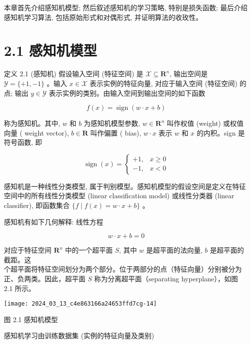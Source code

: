 \documentclass[10pt]{article}
\begin{document}
本章首先介绍感知机模型; 然后叙述感知机的学习策略, 特别是损失函数; 最后介绍感知机学习算法, 包括原始形式和对偶形式, 并证明算法的收玫性。

\section*{2.1 感知机模型}
定义 2.1 (感知机) 假设输入空间 (特征空间) 是 $\mathcal{X} \subseteq \boldsymbol{R}^{n}$, 输出空间是 $\mathcal{Y}=\{+1,-1\}$ 。输入 $x \in \mathcal{X}$ 表示实例的特征向量, 对应于输入空间 (特征空间) 的点; 输出 $y \in \mathcal{Y}$ 表示实例的类别。由输入空间到输出空间的如下函数


\begin{equation*}
f(x)=\operatorname{sign}(w \cdot x+b) \tag{2.1}
\end{equation*}


称为感知机。其中, $w$ 和 $b$ 为感知机模型参数, $w \in \boldsymbol{R}^{n}$ 叫作权值 (weight) 或权值向量 ( weight vector), $b \in \boldsymbol{R}$ 叫作偏置 ( bias), $w \cdot x$ 表示 $w$ 和 $x$ 的内积。sign 是符号函数, 即

\[
\operatorname{sign}(x)= \begin{cases}+1, & x \geqslant 0  \tag{2.2}\\ -1, & x<0\end{cases}
\]

感知机是一种线性分类模型, 属于判别模型。感知机模型的假设空间是定义在特征空间中的所有线性分类模型 (linear classification model) 或线性分类器 (linear classifier), 即函数集合 $\{f \mid f(x)=w \cdot x+b\}$ 。

感知机有如下几何解释: 线性方程


\begin{equation*}
w \cdot x+b=0 \tag{2.3}
\end{equation*}


对应于特征空间 $\boldsymbol{R}^{n}$ 中的一个超平面 $S$, 其中 $w$ 是超平面的法向量, $b$ 是超平面的截距。这\\
个超平面将特征空间划分为两个部分。位于两部分的点（特征向量）分别被分为正、负两类。因此，超平面 $S$ 称为分离超平面（separating hyperplane），如图 2.1 所示。

\begin{center}
\texttt{[image: 2024\_03\_13\_c4e863166a24653ffd7cg-14]}
\end{center}

图 2.1 感知机模型

感知机学习由训练数据集 (实例的特征向量及类别)
\end{document}
